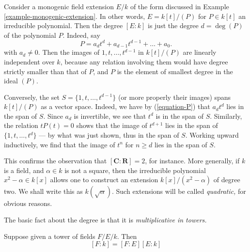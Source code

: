 \begin{example}
\label{example-degree-simple-algebraic-extension}
Consider a monogenic field extension $E/k$ of the form discussed in
Example \ref{example-monogenic-extension}.
In other words, $E = k[t]/(P)$ for $P \in k[t]$ an irreducible polynomial.
Then the degree $[E : k]$ is just the degree $d = \deg(P)$ of the
polynomial $P$. Indeed, say
\begin{equation}
\label{equation-P}
P = a_d t^d + a_{d - 1} t^{d - 1} + \ldots + a_0.
\end{equation}
with $a_d \not = 0$. Then the images of $1, t, \ldots, t^{d - 1}$ in
$k[t]/(P)$ are linearly independent over $k$, because any relation involving
them would have degree strictly smaller than that of $P$, and $P$ is the
element of smallest degree in the ideal $(P)$.

\medskip\noindent
Conversely, the set $S = \{1, t, \ldots, t^{d - 1}\}$ (or more
properly their images) spans $k[t]/(P)$ as a vector space.
Indeed, we have by (\ref{equation-P}) that $a_d t^d$ lies in the span of $S$.
Since $a_d$ is invertible, we see that $t^d$ is in the span of $S$.
Similarly, the relation $t P(t) = 0$ shows that the image of $t^{d + 1}$
lies in the span of $\{1, t, \ldots, t^d\}$ --- by what was just shown, thus
in the span of $S$. Working upward inductively, we find
that the image of $t^n$ for $n \geq d$ lies in the span of $S$.
\end{example}

\noindent
This confirms the observation that $[\mathbf{C}: \mathbf{R}] = 2$, for
instance. More generally, if $k$ is a field, and $\alpha \in k$ is not a
square, then the irreducible polynomial $x^2 - \alpha \in k[x]$ allows one
to construct an extension $k[x]/(x^2 - \alpha)$ of degree two.
We shall write this as $k(\sqrt{\alpha})$. Such extensions will be called
{\it quadratic,} for obvious reasons.

\medskip\noindent
The basic fact about the degree is that it is {\it multiplicative in towers.}

\begin{lemma}[Multiplicativity]
\label{lemma-multiplicativity-degrees}
Suppose given a tower of fields $F/E/k$. Then
$$
[F:k] = [F:E][E:k]
$$
\end{lemma}

